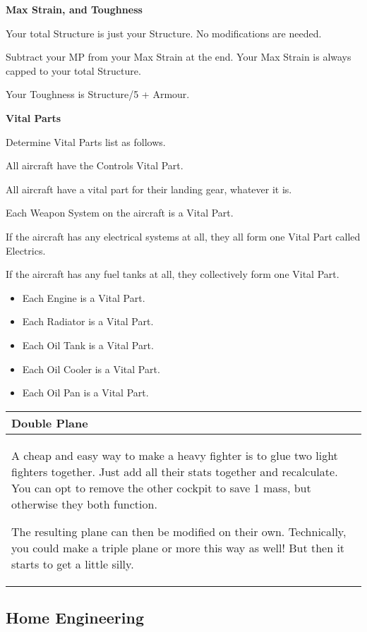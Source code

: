 \documentclass{article}
\begin{document}
\textbf{Max Strain, and Toughness}

Your total Structure is just your Structure. No modifications are
needed.

Subtract your MP from your Max Strain at the end. Your Max Strain
is always capped to your total Structure.

Your Toughness is Structure/5 + Armour.

\textbf{Vital Parts}

Determine Vital Parts list as follows.

All aircraft have the Controls Vital Part.

All aircraft have a vital part for their landing gear, whatever
it is.

Each Weapon System on the aircraft is a Vital Part.

If the aircraft has any electrical systems at all, they all form
one Vital Part called Electrics.

If the aircraft has any fuel tanks at all, they collectively form
one Vital Part.

\begin{itemize}
  \item Each Engine is a Vital Part.
  \item Each Radiator is a Vital Part.
  \item Each Oil Tank is a Vital Part.
  \item Each Oil Cooler is a Vital Part.
  \item Each Oil Pan is a Vital Part.
\end{itemize}

\begin{tabular}{|l}
  \hline
  Double Plane           \\\hline

  A cheap and easy way to make a heavy fighter is to glue two light
  fighters together. Just add all their stats together and recalculate.
  You can opt to remove the other cockpit to save 1 mass, but otherwise
  they both function.

  The resulting plane can then be modified on their own. Technically, you
  could make a triple plane or more this way as well! But then it starts
  to get a little silly. \\\hline
\end{tabular}

\subsection{Home Engineering}
\label{_Home_Engineering}
\end{document}
